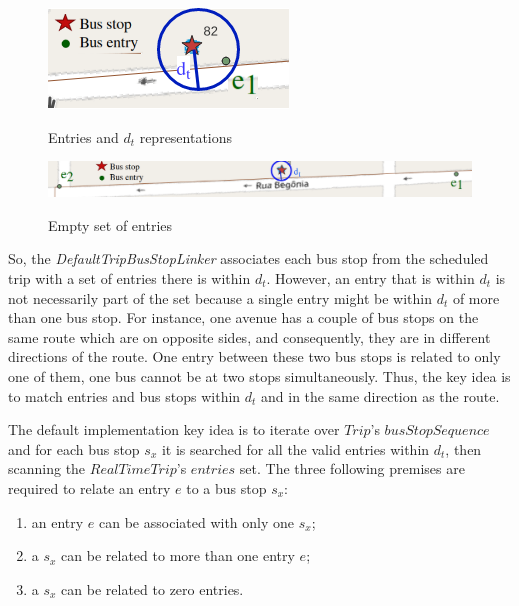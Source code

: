 \begin{figure}[h]
     \centering
        \caption{Entries and $d_t$ representations}
        \includegraphics[scale=.65]{imagem/cap4/entriesDT.drawio.png}
        \label{img:4:3}
\end{figure}

\begin{figure}[h]
     \centering
        \caption{Empty set of entries}
        \includegraphics[width=\textwidth]{imagem/cap4/9202_empty_set.png}
        \label{img:4:emptyset}
\end{figure}

So, the \textit{DefaultTripBusStopLinker} associates each bus stop from 
the scheduled trip with a set of entries there is within $d_t$.
However, an entry that is within $d_t$ is not necessarily 
part of the set because a single entry might be within $d_t$
of more than one bus stop. 
For instance, one avenue has a couple of bus stops on the same route
which are on opposite sides, and consequently, 
they are in different directions of the route. 
One entry between these two bus stops is related 
to only one of them, one bus cannot be at two stops simultaneously. Thus, the key idea is to match entries and bus
stops within $d_t$ and in the same direction as the route.

The default implementation key idea is to iterate over $Trip$'s $busStopSequence$
and for each bus stop $s_x$ it is searched for all the valid entries within $d_t$, then scanning the $RealTimeTrip$'s $entries$ set.
The three following premises are required to relate an entry $e$ to a bus stop $s_x$:
\begin{enumerate}
  \item an entry $e$ can be associated with only one $s_x$;
  \item a $s_x$ can be related to more than one entry $e$;
  \item a $s_x$ can be related to zero entries.
\end{enumerate}

